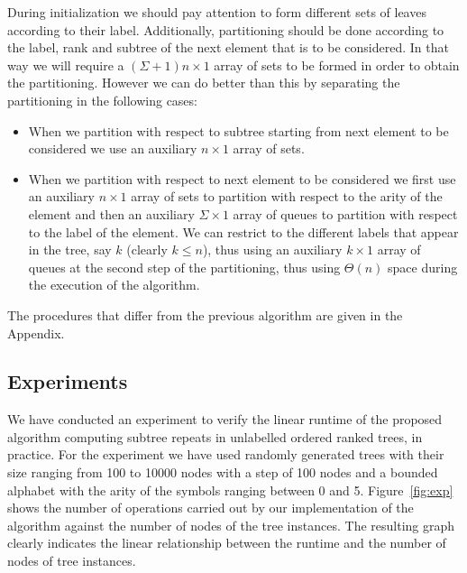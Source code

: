 \documentclass[preprint,12pt]{elsarticle}
\begin{document}
During initialization we should pay attention to form different sets of leaves according to their label. Additionally, partitioning should be done according to the label, rank and subtree of the next element that is to be considered. In that way we will require a $(\Sigma+1)n \times 1$ array of sets to be formed in order to obtain the partitioning. However we can do better than this by  separating the partitioning in the following cases:
\begin{itemize}
 \item When we partition with respect to subtree starting from next element to be considered we use an auxiliary $n \times 1$ array of sets.
 \item When we partition with respect to next element to be considered we first use an auxiliary $n \times 1$ array of sets to partition with respect to the arity of the element and then an auxiliary $\Sigma \times 1$ array of queues to partition with respect to the label of the element. We can restrict to the different labels that appear in the tree, say $k$ (clearly $k\leq n$), thus using an auxiliary $k \times 1$ array of queues at the second step of the partitioning, thus using $\Theta(n)$ space during the execution of the algorithm.
\end{itemize}
The procedures that differ from the previous algorithm are given in the Appendix.

\subsection{Experiments}
\label{Expe}
We have conducted an experiment to verify the linear runtime of the proposed
algorithm computing subtree repeats in unlabelled ordered ranked
trees, in practice. For the experiment we have used randomly generated
 trees with their size ranging from 100 to 10000 nodes with a step of 100
nodes and a bounded alphabet with the arity of the symbols ranging between 0
and 5.
Figure~\ref{fig:exp} shows the number of operations carried out by our
implementation of the algorithm against the number of nodes of the tree 
instances. The resulting graph clearly indicates the linear relationship between
the runtime and the number of nodes of tree instances.
\end{document}
